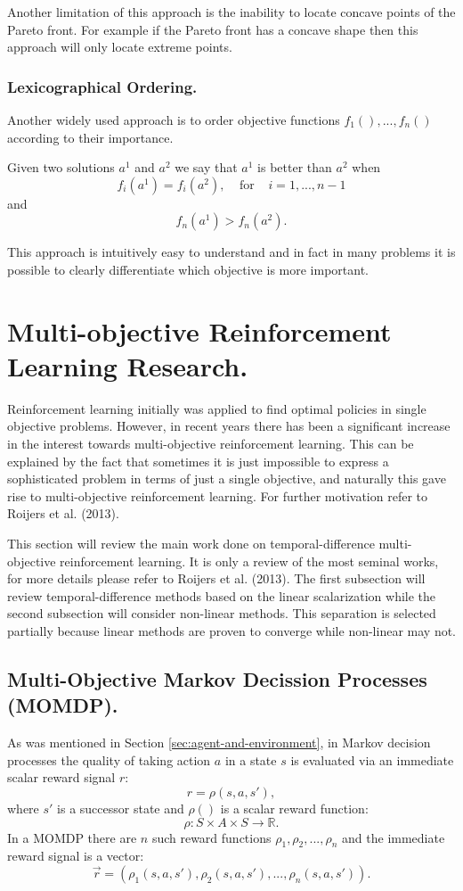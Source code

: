 Another limitation of this approach is the inability to locate concave points of the Pareto front. For example if the Pareto front has a concave shape then this approach will only locate extreme points.

\subsubsection{Lexicographical Ordering.}
Another widely used approach is to order objective functions $ f_{1}(),...,f_{n}() $ according to their importance.

Given two solutions $a^{1}$ and $a^{2}$ we say that $a^{1}$ is better than $a^{2}$ when $$ f_{i}(a^{1}) = f_{i}(a^{2}), \;\;\;\;\text{for}\;\;\;\; i = 1,...,n-1$$
and
$$ f_{n}(a^{1}) > f_{n}(a^{2}). $$

This approach is intuitively easy to understand and in fact in many problems it is possible to clearly differentiate which objective is more important.

\section{Multi-objective Reinforcement Learning Research.}

Reinforcement learning initially was applied to find optimal policies in single objective problems. However, in recent years there has been a significant increase in the interest towards multi-objective reinforcement learning. This can be explained by the fact that sometimes it is just impossible to express a sophisticated problem in terms of just a single objective, and naturally this gave rise to multi-objective reinforcement learning. For further motivation refer to Roijers et al. (2013)\nocite{roijers2013survey}.

This section will review the main work done on temporal-difference multi-objective reinforcement learning. It is only a review of the most seminal works, for more details please refer to Roijers et al. (2013)\nocite{roijers2013survey}. The first subsection will review temporal-difference methods based on the linear scalarization while the second subsection will consider non-linear methods. This separation is selected partially because linear methods are proven to converge while non-linear may not.

\subsection{Multi-Objective Markov Decission Processes (MOMDP).}
As was mentioned in Section \ref{sec:agent-and-environment}, in Markov decision processes the quality of taking action $a$ in a state $s$ is evaluated via an immediate scalar reward signal $r$:
$$ r = \rho(s,a,s'), $$
where $s'$ is a successor state and $\rho()$ is a scalar reward function:
$$ \rho : S \times A \times  S \rightarrow \mathbb{R}. $$
In a MOMDP there are $n$ such reward functions $\rho_{1},\rho_{2},...,\rho_{n}$ and the immediate reward signal is a vector:
$$ \vec{r} = (\rho_{1}(s,a,s'),\rho_{2}(s,a,s'),...,\rho_{n}(s,a,s')). $$

